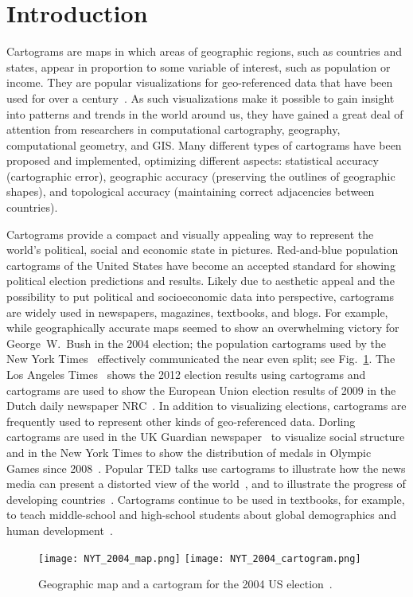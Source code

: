 \documentclass[10pt,journal,compsoc]{IEEEtran}
\begin{document}
\IEEEdisplaynontitleabstractindextext
\IEEEpeerreviewmaketitle





\section{Introduction}


Cartograms are maps in which areas of geographic regions, such as countries and states, appear in proportion to some variable of interest, such as population or income. They are popular visualizations for geo-referenced data that have been used for over a century~\cite{Tobler04}. As such visualizations make it possible to gain insight into patterns and
trends in the world around us, they have gained a great deal of attention from researchers in computational cartography, geography, computational geometry, and GIS.  Many different types of cartograms have been proposed and implemented, optimizing different aspects: statistical accuracy (cartographic error), geographic accuracy (preserving the outlines of geographic shapes), and topological accuracy (maintaining correct adjacencies between countries). 


Cartograms provide a compact and visually appealing way to represent the world's political, social and economic state in pictures. Red-and-blue population cartograms of the United States have become an accepted standard for showing political election predictions and results.
Likely due to aesthetic appeal and the possibility to 
put political and socioeconomic data into perspective, cartograms are widely used  in newspapers, magazines, textbooks, and blogs. 
For example, while geographically  accurate maps seemed to show an overwhelming victory for George~W.~Bush in the 2004 election; the population cartograms used by the New York Times~\cite{NYT_04}
 effectively communicated the near even split; see Fig.~\ref{fig:red-blue}. 
The Los Angeles Times~\cite{LAT12} shows the 2012 election results using cartograms and cartograms are used to show the European Union election results of 2009 in the Dutch daily newspaper NRC~\cite{NRC}. In addition to visualizing elections, cartograms are frequently used to represent other kinds of geo-referenced data. Dorling cartograms are used in the UK Guardian newspaper~\cite{Guar} to visualize social structure and in the New York Times to show the distribution of medals in Olympic Games since 2008~\cite{NYT16}. 
Popular TED talks use cartograms to illustrate how the news media can present a distorted view of the world~\cite{Alisa}, 
and to illustrate the progress of developing countries~\cite{Hans2}.
 Cartograms continue to be used in textbooks, for example, to teach middle-school and high-school students about global demographics and human development~\cite{Class2}.
\begin{figure}
{
\centering
\texttt{[image: NYT\_2004\_map.png]} 
\texttt{[image: NYT\_2004\_cartogram.png]}
\caption{Geographic map and a cartogram for the 2004 US election~\cite{NYT_04}.}
\label{fig:red-blue}
}
\end{figure}
\end{document}
